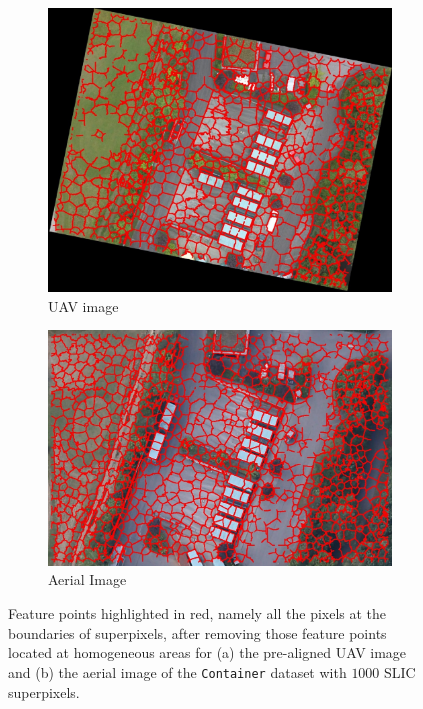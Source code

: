 \begin{figure}[tbp]
    \centering
       \begin{subfigure}[b]{0.4\columnwidth}
           \centering
           \includegraphics[height=0.2\textheight]{figures_4/keypoints_uav}
           \caption[]{UAV image}%
       \end{subfigure}
       \begin{subfigure}[b]{0.4821\columnwidth}  
           \centering 
           \includegraphics[height=0.2\textheight]{figures_4/keypoints_air}
           \caption[]{Aerial Image}%
       \end{subfigure}
       \caption{Feature points highlighted in red, namely all the pixels at the boundaries of superpixels, after removing those feature points located at homogeneous areas for (a) the pre-aligned UAV image and (b) the aerial image of the \texttt{Container} dataset with $1000$ SLIC superpixels.}
        \label{fig:slic}
\end{figure}

